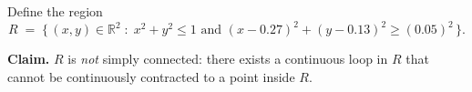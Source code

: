 \begin{problem}
Define the region
\[
  R \;=\; \bigl\{\,(x, y) \in \mathbb{R}^{2} \;:\;
    x^{2} + y^{2} \leq 1
    \text{ and }
    (x - 0.27)^{2} + (y - 0.13)^{2} \geq (0.05)^{2}\,\bigr\}.
\]

\textbf{Claim.} $R$ is \emph{not} simply connected: there exists a
continuous loop in $R$ that cannot be continuously contracted to a
point inside $R$.
\end{problem}
